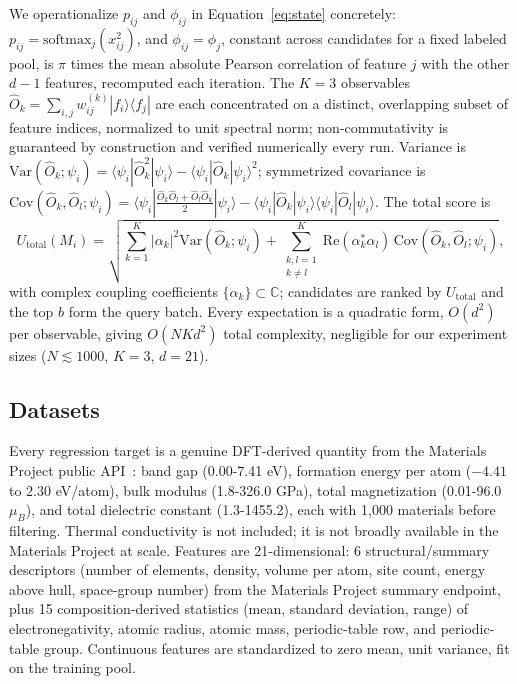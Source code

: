 \documentclass[10pt]{article}
\begin{document}
We operationalize $p_{ij}$ and $\phi_{ij}$ in Equation~\ref{eq:state} concretely: $p_{ij}=\mathrm{softmax}_j(x_{ij}^2)$, and $\phi_{ij}=\phi_j$, constant across candidates for a fixed labeled pool, is $\pi$ times the mean absolute Pearson correlation of feature $j$ with the other $d-1$ features, recomputed each iteration. The $K=3$ observables $\hat O_k=\sum_{i,j}w^{(k)}_{ij}|f_i\rangle\langle f_j|$ are each concentrated on a distinct, overlapping subset of feature indices, normalized to unit spectral norm; non-commutativity is guaranteed by construction and verified numerically every run. Variance is $\mathrm{Var}(\hat O_k;\psi_i)=\langle\psi_i|\hat O_k^2|\psi_i\rangle-\langle\psi_i|\hat O_k|\psi_i\rangle^2$; symmetrized covariance is $\mathrm{Cov}(\hat O_k,\hat O_l;\psi_i)=\langle\psi_i|\tfrac{\hat O_k\hat O_l+\hat O_l\hat O_k}{2}|\psi_i\rangle-\langle\psi_i|\hat O_k|\psi_i\rangle\langle\psi_i|\hat O_l|\psi_i\rangle$. The total score is
\begin{equation}
U_{\mathrm{total}}(M_i) = \sqrt{\sum_{k=1}^K |\alpha_k|^2 \mathrm{Var}(\hat{O}_k;\psi_i) + \sum_{\substack{k,l=1\\k\neq l}}^{K} \mathrm{Re}(\alpha_k^*\alpha_l)\,\mathrm{Cov}(\hat{O}_k,\hat{O}_l;\psi_i)}, \label{eq:utotal}
\end{equation}
with complex coupling coefficients $\{\alpha_k\}\subset\mathbb{C}$; candidates are ranked by $U_{\mathrm{total}}$ and the top $b$ form the query batch. Every expectation is a quadratic form, $O(d^2)$ per observable, giving $O(NKd^2)$ total complexity, negligible for our experiment sizes ($N\lesssim1000$, $K=3$, $d=21$).

\subsection{Datasets}

Every regression target is a genuine DFT-derived quantity from the Materials Project public API~\cite{jain2013materials}: band gap (0.00-7.41 eV), formation energy per atom ($-4.41$ to $2.30$ eV/atom), bulk modulus (1.8-326.0 GPa), total magnetization (0.01-96.0 $\mu_B$), and total dielectric constant (1.3-1455.2), each with 1,000 materials before filtering. Thermal conductivity is not included; it is not broadly available in the Materials Project at scale. Features are 21-dimensional: 6 structural/summary descriptors (number of elements, density, volume per atom, site count, energy above hull, space-group number) from the Materials Project summary endpoint, plus 15 composition-derived statistics (mean, standard deviation, range) of electronegativity, atomic radius, atomic mass, periodic-table row, and periodic-table group. Continuous features are standardized to zero mean, unit variance, fit on the training pool.
\end{document}
